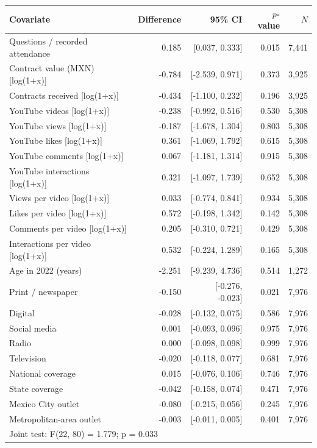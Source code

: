 \begin{tabular}{lrrrr}
\toprule
Covariate & Difference & 95\% CI & $p$-value & $N$ \\
\midrule
Questions / recorded attendance & 0.185 & [0.037, 0.333] & 0.015 & 7,441 \\
Contract value (MXN) [log(1+x)] & -0.784 & [-2.539, 0.971] & 0.373 & 3,925 \\
Contracts received [log(1+x)] & -0.434 & [-1.100, 0.232] & 0.196 & 3,925 \\
YouTube videos [log(1+x)] & -0.238 & [-0.992, 0.516] & 0.530 & 5,308 \\
YouTube views [log(1+x)] & -0.187 & [-1.678, 1.304] & 0.803 & 5,308 \\
YouTube likes [log(1+x)] & 0.361 & [-1.069, 1.792] & 0.615 & 5,308 \\
YouTube comments [log(1+x)] & 0.067 & [-1.181, 1.314] & 0.915 & 5,308 \\
YouTube interactions [log(1+x)] & 0.321 & [-1.097, 1.739] & 0.652 & 5,308 \\
Views per video [log(1+x)] & 0.033 & [-0.774, 0.841] & 0.934 & 5,308 \\
Likes per video [log(1+x)] & 0.572 & [-0.198, 1.342] & 0.142 & 5,308 \\
Comments per video [log(1+x)] & 0.205 & [-0.310, 0.721] & 0.429 & 5,308 \\
Interactions per video [log(1+x)] & 0.532 & [-0.224, 1.289] & 0.165 & 5,308 \\
Age in 2022 (years) & -2.251 & [-9.239, 4.736] & 0.514 & 1,272 \\
Print / newspaper & -0.150 & [-0.276, -0.023] & 0.021 & 7,976 \\
Digital & -0.028 & [-0.132, 0.075] & 0.586 & 7,976 \\
Social media & 0.001 & [-0.093, 0.096] & 0.975 & 7,976 \\
Radio & 0.000 & [-0.098, 0.098] & 0.999 & 7,976 \\
Television & -0.020 & [-0.118, 0.077] & 0.681 & 7,976 \\
National coverage & 0.015 & [-0.076, 0.106] & 0.746 & 7,976 \\
State coverage & -0.042 & [-0.158, 0.074] & 0.471 & 7,976 \\
Mexico City outlet & -0.080 & [-0.215, 0.056] & 0.245 & 7,976 \\
Metropolitan-area outlet & -0.003 & [-0.011, 0.005] & 0.401 & 7,976 \\
\midrule
\multicolumn{5}{l}{Joint test: F(22, 80) = 1.779; p = 0.033} \\
\bottomrule
\end{tabular}
